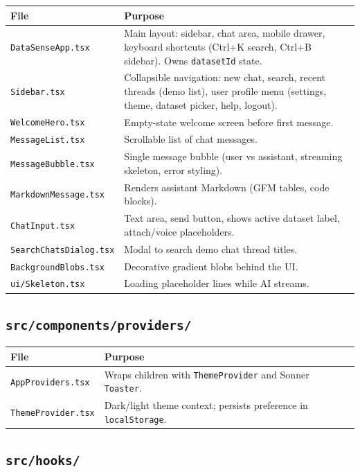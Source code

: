 \documentclass[11pt,a4paper]{article}
\begin{document}
\begin{longtable}{@{}p{4.2cm}p{9.8cm}@{}}
\toprule
\textbf{File} & \textbf{Purpose} \\
\midrule
\endhead
\texttt{DataSenseApp.tsx} & Main layout: sidebar, chat area, mobile drawer, keyboard shortcuts (Ctrl+K search, Ctrl+B sidebar). Owns \texttt{datasetId} state. \\
\texttt{Sidebar.tsx} & Collapsible navigation: new chat, search, recent threads (demo list), user profile menu (settings, theme, dataset picker, help, logout). \\
\texttt{WelcomeHero.tsx} & Empty-state welcome screen before first message. \\
\texttt{MessageList.tsx} & Scrollable list of chat messages. \\
\texttt{MessageBubble.tsx} & Single message bubble (user vs assistant, streaming skeleton, error styling). \\
\texttt{MarkdownMessage.tsx} & Renders assistant Markdown (GFM tables, code blocks). \\
\texttt{ChatInput.tsx} & Text area, send button, shows active dataset label, attach/voice placeholders. \\
\texttt{SearchChatsDialog.tsx} & Modal to search demo chat thread titles. \\
\texttt{BackgroundBlobs.tsx} & Decorative gradient blobs behind the UI. \\
\texttt{ui/Skeleton.tsx} & Loading placeholder lines while AI streams. \\
\bottomrule
\end{longtable}

\subsection{\texttt{src/components/providers/}}

\begin{longtable}{@{}p{4.2cm}p{9.8cm}@{}}
\toprule
\textbf{File} & \textbf{Purpose} \\
\midrule
\endhead
\texttt{AppProviders.tsx} & Wraps children with \texttt{ThemeProvider} and Sonner \texttt{Toaster}. \\
\texttt{ThemeProvider.tsx} & Dark/light theme context; persists preference in \texttt{localStorage}. \\
\bottomrule
\end{longtable}

\subsection{\texttt{src/hooks/}}
\end{document}
